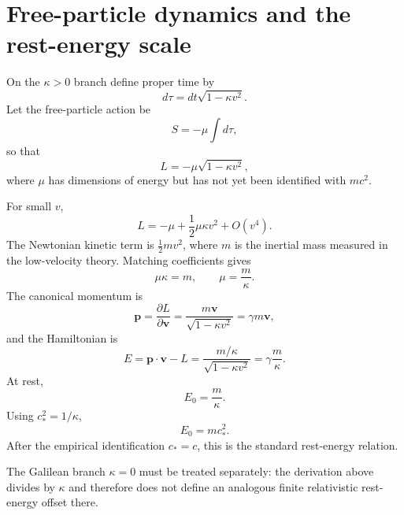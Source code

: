 \documentclass[11pt,a4paper]{article}
\newcommand{\kpar}{\kappa}
\newcommand{\cstar}{c_{\!*}}
\begin{document}
\section{Free-particle dynamics and the rest-energy scale}
On the $\kpar>0$ branch define proper time by
\begin{equation}
d\tau=dt\sqrt{1-\kpar v^2}.
\end{equation}
Let the free-particle action be
\begin{equation}
S=-\mu\int d\tau,
\end{equation}
so that
\begin{equation}
L=-\mu\sqrt{1-\kpar v^2},
\label{eq:lagmu}
\end{equation}
where $\mu$ has dimensions of energy but has not yet been identified with $mc^2$.

For small $v$,
\begin{equation}
L=-\mu+\frac{1}{2}\mu\kpar v^2+O(v^4).
\end{equation}
The Newtonian kinetic term is $\tfrac12mv^2$, where $m$ is the inertial mass measured in the low-velocity theory. Matching coefficients gives
\begin{equation}
\mu\kpar=m,
\qquad
\mu=\frac{m}{\kpar}.
\label{eq:mumatch}
\end{equation}
The canonical momentum is
\begin{equation}
\bm p=\frac{\partial L}{\partial \bm v}
=\frac{m\bm v}{\sqrt{1-\kpar v^2}}
=\gamma m\bm v,
\end{equation}
and the Hamiltonian is
\begin{equation}
E=\bm p\!\cdot\bm v-L
=\frac{m/\kpar}{\sqrt{1-\kpar v^2}}
=\gamma\frac{m}{\kpar}.
\label{eq:energykappa}
\end{equation}
At rest,
\begin{equation}
\boxed{E_0=\frac{m}{\kpar}}.
\label{eq:e0kappa}
\end{equation}
Using $\cstar^2=1/\kpar$,
\begin{equation}
\boxed{E_0=m\cstar^2}.
\end{equation}
After the empirical identification $\cstar=c$, this is the standard rest-energy relation.

The Galilean branch $\kpar=0$ must be treated separately: the derivation above divides by $\kpar$ and therefore does not define an analogous finite relativistic rest-energy offset there.
\end{document}
